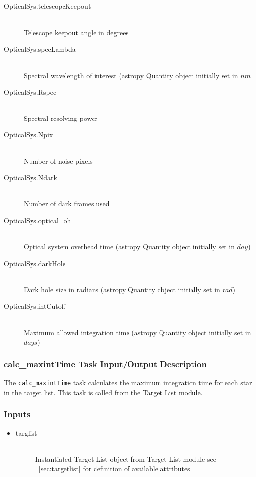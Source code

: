 \documentclass[cleanfoot]{asme2ej}
\begin{document}
\begin{itemize}
\begin{description}
        \item[OpticalSys.telescopeKeepout] \hfill \\
        Telescope keepout angle in degrees
        \item[OpticalSys.specLambda] \hfill \\
        Spectral wavelength of interest (astropy Quantity object initially set in $ nm $
        \item[OpticalSys.Rspec] \hfill \\
        Spectral resolving power
        \item[OpticalSys.Npix] \hfill \\
        Number of noise pixels
        \item[OpticalSys.Ndark] \hfill \\
        Number of dark frames used
        \item[OpticalSys.optical\_oh] \hfill \\
        Optical system overhead time (astropy Quantity object initially set in $ day $)
        \item[OpticalSys.darkHole] \hfill \\
        Dark hole size in radians (astropy Quantity object initially set in $ rad $)
        \item[OpticalSys.intCutoff] \hfill \\
        Maximum allowed integration time (astropy Quantity object initially set in $ days $)
    \end{description}
\end{itemize}

\subsubsection{calc\_maxintTime Task Input/Output Description} \label{sec:calcmaxintTimetask}
The \verb+calc_maxintTime+ task calculates the maximum integration time for each star in the target list.  This task is called from the Target List module.
\subsubsection*{Inputs}
\begin{itemize}
    \item 
    \begin{description}
        \item[targlist] \hfill \\
        Instantiated Target List object from Target List module see ~\ref{sec:targetlist} for definition of available attributes
    \end{description}
\end{itemize}
\end{document}
